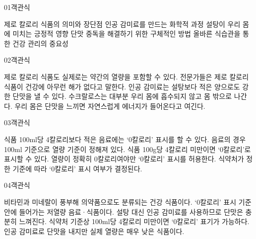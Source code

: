 \documentclass[fs9,seriesFre]{korfarm-base}
\begin{document}
\par\medskip
\kfBeginMC
\begin{kfQBlock}{01}{객관식}
\begin{kfChoices}
\kfChoice 제로 칼로리 식품의 의미와 장단점
\kfChoice 인공 감미료를 만드는 화학적 과정
\kfChoice 설탕이 우리 몸에 미치는 긍정적 영향
\kfChoice 단맛 중독을 해결하기 위한 구체적인 방법
\kfChoice 올바른 식습관을 통한 건강 관리의 중요성
\end{kfChoices}
\end{kfQBlock}
\begin{kfQBlock}{02}{객관식}
\begin{kfChoices}
\kfChoice 제로 칼로리 식품도 실제로는 약간의 열량을 포함할 수 있다.
\kfChoice 전문가들은 제로 칼로리 식품이 건강에 아무런 해가 없다고 말한다.
\kfChoice 인공 감미료는 설탕보다 적은 양으로도 강한 단맛을 낼 수 있다.
\kfChoice 수크랄로스는 대부분 우리 몸에 흡수되지 않고 몸 밖으로 나간다.
\kfChoice 우리 몸은 단맛을 느끼면 자연스럽게 에너지가 들어온다고 여긴다.
\end{kfChoices}
\end{kfQBlock}
\begin{kfQBlock}{03}{객관식}
\begin{kfChoices}
\kfChoice 식품 100ml당 4칼로리보다 적은 음료에는 ‘0칼로리’ 표시를 할 수 있다.
\kfChoice 음료의 경우 100ml 기준으로 열량 기준이 정해져 있다.
\kfChoice 식품 100g당 4칼로리 미만이면 ‘0칼로리’로 표시할 수 있다.
\kfChoice 열량이 정확히 0칼로리여야만 ‘0칼로리’ 표시를 허용한다.
\kfChoice 식약처가 정한 기준에 따라 ‘0칼로리’ 표시 여부가 결정된다.
\end{kfChoices}
\end{kfQBlock}
\begin{kfQBlock}{04}{객관식}
\begin{kfChoices}
\kfChoice 비타민과 미네랄이 풍부해 의약품으로도 분류되는 건강 식품이다.
\kfChoice ‘0칼로리’ 표시 기준 안에 들어가는 저열량 음료·식품이다.
\kfChoice 설탕 대신 인공 감미료를 사용하므로 단맛은 충분히 느껴진다.
\kfChoice 식약처 기준상 100ml당 4칼로리 미만이면 ‘0칼로리’ 표기가 가능하다.
\kfChoice 인공 감미료로 단맛을 내지만 실제 열량은 매우 낮은 식품이다.
\end{kfChoices}
\end{kfQBlock}
\end{document}
